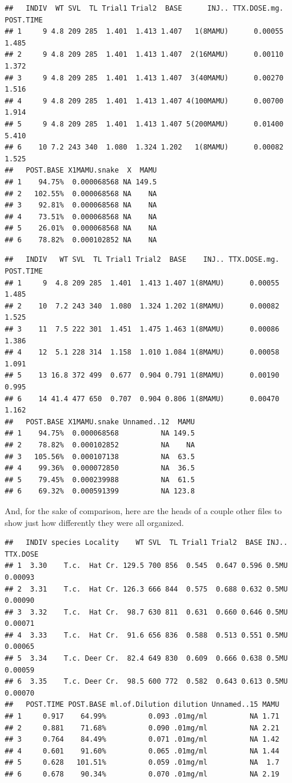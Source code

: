 \documentclass[
]{article}
\begin{document}
\begin{verbatim}
##   INDIV  WT SVL  TL Trial1 Trial2  BASE      INJ.. TTX.DOSE.mg. POST.TIME
## 1     9 4.8 209 285  1.401  1.413 1.407   1(8MAMU)      0.00055     1.485
## 2     9 4.8 209 285  1.401  1.413 1.407  2(16MAMU)      0.00110     1.372
## 3     9 4.8 209 285  1.401  1.413 1.407  3(40MAMU)      0.00270     1.516
## 4     9 4.8 209 285  1.401  1.413 1.407 4(100MAMU)      0.00700     1.914
## 5     9 4.8 209 285  1.401  1.413 1.407 5(200MAMU)      0.01400     5.410
## 6    10 7.2 243 340  1.080  1.324 1.202   1(8MAMU)      0.00082     1.525
##   POST.BASE X1MAMU.snake  X  MAMU
## 1    94.75%  0.000068568 NA 149.5
## 2   102.55%  0.000068568 NA    NA
## 3    92.81%  0.000068568 NA    NA
## 4    73.51%  0.000068568 NA    NA
## 5    26.01%  0.000068568 NA    NA
## 6    78.82%  0.000102852 NA    NA
\end{verbatim}

\begin{verbatim}
##   INDIV   WT SVL  TL Trial1 Trial2  BASE    INJ.. TTX.DOSE.mg. POST.TIME
## 1     9  4.8 209 285  1.401  1.413 1.407 1(8MAMU)      0.00055     1.485
## 2    10  7.2 243 340  1.080  1.324 1.202 1(8MAMU)      0.00082     1.525
## 3    11  7.5 222 301  1.451  1.475 1.463 1(8MAMU)      0.00086     1.386
## 4    12  5.1 228 314  1.158  1.010 1.084 1(8MAMU)      0.00058     1.091
## 5    13 16.8 372 499  0.677  0.904 0.791 1(8MAMU)      0.00190     0.995
## 6    14 41.4 477 650  0.707  0.904 0.806 1(8MAMU)      0.00470     1.162
##   POST.BASE X1MAMU.snake Unnamed..12  MAMU
## 1    94.75%  0.000068568          NA 149.5
## 2    78.82%  0.000102852          NA    NA
## 3   105.56%  0.000107138          NA  63.5
## 4    99.36%  0.000072850          NA  36.5
## 5    79.45%  0.000239988          NA  61.5
## 6    69.32%  0.000591399          NA 123.8
\end{verbatim}

And, for the sake of comparison, here are the heads of a couple other
files to show just how differently they were all organized.

\begin{verbatim}
##   INDIV species Locality    WT SVL  TL Trial1 Trial2  BASE INJ.. TTX.DOSE
## 1  3.30    T.c.  Hat Cr. 129.5 700 856  0.545  0.647 0.596 0.5MU  0.00093
## 2  3.31    T.c.  Hat Cr. 126.3 666 844  0.575  0.688 0.632 0.5MU  0.00090
## 3  3.32    T.c.  Hat Cr.  98.7 630 811  0.631  0.660 0.646 0.5MU  0.00071
## 4  3.33    T.c.  Hat Cr.  91.6 656 836  0.588  0.513 0.551 0.5MU  0.00065
## 5  3.34    T.c. Deer Cr.  82.4 649 830  0.609  0.666 0.638 0.5MU  0.00059
## 6  3.35    T.c. Deer Cr.  98.5 600 772  0.582  0.643 0.613 0.5MU  0.00070
##   POST.TIME POST.BASE ml.of.Dilution dilution Unnamed..15 MAMU
## 1     0.917    64.99%          0.093 .01mg/ml          NA 1.71
## 2     0.881    71.68%          0.090 .01mg/ml          NA 2.21
## 3     0.764    84.49%          0.071 .01mg/ml          NA 1.42
## 4     0.601    91.60%          0.065 .01mg/ml          NA 1.44
## 5     0.628   101.51%          0.059 .01mg/ml          NA  1.7
## 6     0.678    90.34%          0.070 .01mg/ml          NA 2.19
\end{verbatim}
\end{document}
